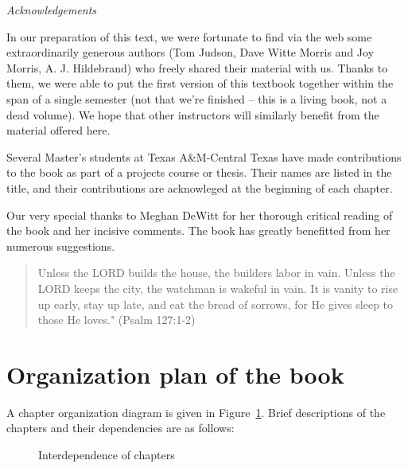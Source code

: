 \medskip

\noindent
\emph{Acknowledgements}
\smallskip

In our preparation of this text, we were fortunate to find via the web  some extraordinarily generous authors (Tom Judson, Dave Witte Morris and Joy Morris, A. J. Hildebrand) who freely shared their material with us. Thanks to them, we were able to put the first version of this  textbook together within the span of a single semester (not that we're finished -- this is a living book, not a dead volume). We hope that other instructors will similarly benefit from the material offered here.  

Several Master's students at Texas A\&M-Central Texas have made contributions to the book as part of a projects course or thesis. Their names are listed in the title, and their contributions are acknowleged at the beginning of each chapter. 

Our very special thanks to Meghan DeWitt for her thorough critical reading of the book and her incisive comments. The book has greatly benefitted from her numerous suggestions.
\medskip 

\begin{quote}
Unless the LORD builds the house, the builders labor in vain. Unless the LORD keeps the city, the watchman is wakeful in vain.  It is vanity to rise up early, stay up late, and eat the bread of sorrows, for He gives sleep to those He loves."  (Psalm 127:1-2)
\end{quote}

\section*{Organization plan of the book}
\label{OrganizationPlanOfTheBook}
A chapter organization diagram is given in Figure~\ref{fig:organization}. Brief descriptions of the chapters and their dependencies are as follows:
\begin{figure}[htb]
	  \caption{\label{fig:organization} Interdependence of chapters}
\end{figure}

